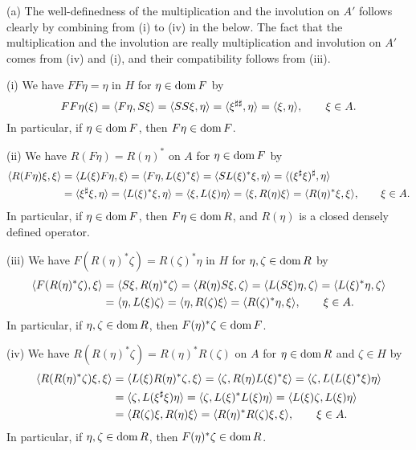 \documentclass{../../large}
\begin{document}
\begin{pf}
(a)
The well-definedness of the multiplication and the involution on $A'$ follows clearly by combining from (i) to (iv) in the below.
The fact that the multiplication and the involution are really multiplication and involution on $A'$ comes from (iv) and (i), and their compatibility follows from (iii).

(i)
We have $FF\eta=\eta$ in $H$ for $\eta\in \operatorname{dom} F$ by
\[FF\eta(\xi)=\langle F\eta,S\xi\rangle=\langle SS\xi,\eta\rangle=\langle\xi^{\sharp\sharp},\eta\rangle=\langle\xi,\eta\rangle,\qquad\xi\in A.\]
In particular, if $\eta\in\operatorname{dom} F$, then $F\eta\in\operatorname{dom} F$.

(ii)
We have $R(F\eta)=R(\eta)^*$ on $A$ for $\eta\in\operatorname{dom} F$ by
\begin{align*}
\langle R(F\eta)\xi,\xi\rangle
&=\langle L(\xi)F\eta,\xi\rangle
=\langle F\eta,L(\xi)^*\xi\rangle
=\langle SL(\xi)^*\xi,\eta\rangle
=\langle(\xi^\sharp\xi)^\sharp,\eta\rangle\\
&=\langle\xi^\sharp\xi,\eta\rangle
=\langle L(\xi)^*\xi,\eta\rangle
=\langle\xi,L(\xi)\eta\rangle
=\langle\xi,R(\eta)\xi\rangle
=\langle R(\eta)^*\xi,\xi\rangle
,\qquad\xi\in A.
\end{align*}
In particular, if $\eta\in\operatorname{dom} F$, then $F\eta\in\operatorname{dom} R$, and $R(\eta)$ is a closed densely defined operator.

(iii)
We have $F(R(\eta)^*\zeta)=R(\zeta)^*\eta$ in $H$ for $\eta,\zeta\in\operatorname{dom} R$ by
\begin{align*}
\langle F(R(\eta)^*\zeta),\xi\rangle
&=\langle S\xi,R(\eta)^*\zeta\rangle
=\langle R(\eta)S\xi,\zeta\rangle
=\langle L(S\xi)\eta,\zeta\rangle
=\langle L(\xi)^*\eta,\zeta\rangle\\
&=\langle\eta,L(\xi)\zeta\rangle
=\langle\eta,R(\zeta)\xi\rangle
=\langle R(\zeta)^*\eta,\xi\rangle
,\qquad\xi\in A.
\end{align*}
In particular, if $\eta,\zeta\in\operatorname{dom} R$, then $F(\eta)^*\zeta\in\operatorname{dom} F$.

(iv)
We have $R(R(\eta)^*\zeta)=R(\eta)^*R(\zeta)$ on $A$ for $\eta\in\operatorname{dom} R$ and $\zeta\in H$ by
\begin{align*}
\langle R(R(\eta)^*\zeta)\xi,\xi\rangle
&=\langle L(\xi)R(\eta)^*\zeta,\xi\rangle
=\langle\zeta,R(\eta)L(\xi)^*\xi\rangle
=\langle\zeta,L(L(\xi)^*\xi)\eta\rangle\\
&=\langle\zeta,L(\xi^\sharp\xi)\eta\rangle
=\langle\zeta,L(\xi)^*L(\xi)\eta\rangle
=\langle L(\xi)\zeta,L(\xi)\eta\rangle\\
&=\langle R(\zeta)\xi,R(\eta)\xi\rangle
=\langle R(\eta)^*R(\zeta)\xi,\xi\rangle
,\qquad\xi\in A.
\end{align*}
In particular, if $\eta,\zeta\in\operatorname{dom} R$, then $F(\eta)^*\zeta\in\operatorname{dom} R$.


\end{pf}
\end{document}
